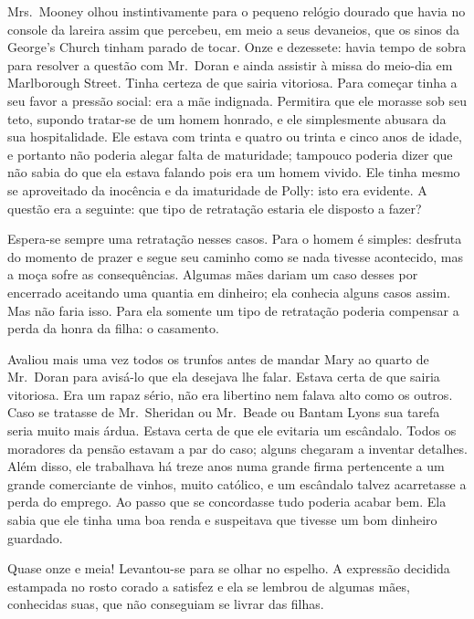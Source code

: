 Mrs.~Mooney olhou instintivamente para o pequeno relógio dourado que havia no
console da lareira assim que percebeu, em meio a seus devaneios, que os sinos
da George’s Church tinham parado de tocar.  Onze e dezessete: havia tempo de
sobra para resolver a questão com Mr.~Doran e ainda assistir à missa do
meio-dia em Marlborough Street.  Tinha certeza de que sairia vitoriosa.  Para
começar tinha a seu favor a pressão social: era a mãe indignada.  Permitira que
ele morasse sob seu teto, supondo tratar-se de um homem honrado, e ele
simplesmente abusara da sua hospitalidade.  Ele estava com trinta e quatro ou
trinta e cinco anos de idade, e portanto não poderia alegar falta de
maturidade; tampouco poderia dizer que não sabia do que ela estava falando pois
era um homem vivido.  Ele tinha mesmo se aproveitado da inocência e da
imaturidade de Polly: isto era evidente.  A questão era a seguinte: que tipo de
retratação estaria ele disposto a fazer?

Espera-se sempre uma retratação nesses casos.  Para o homem é simples: desfruta
do momento de prazer e segue seu caminho como se nada tivesse acontecido, mas a
moça sofre as consequências.  Algumas mães dariam um caso desses por encerrado
aceitando uma quantia em dinheiro; ela conhecia alguns casos assim.  Mas não
faria isso.  Para ela somente um tipo de retratação poderia compensar a perda
da honra da filha: o casamento.

Avaliou mais uma vez todos os trunfos antes de mandar Mary ao quarto de Mr.~Doran 
para avisá-lo que ela desejava lhe falar.  Estava certa de que sairia
vitoriosa.  Era um rapaz sério, não era libertino nem falava alto como os
outros.  Caso se tratasse de Mr.~Sheridan ou Mr.~Beade ou Bantam Lyons sua
tarefa seria muito mais árdua.  Estava certa de que ele evitaria um escândalo.
Todos os moradores da pensão estavam a par do caso; alguns chegaram a inventar
detalhes.  Além disso, ele trabalhava há treze anos numa grande firma
pertencente a um grande comerciante de vinhos, muito católico, e um escândalo
talvez acarretasse a perda do emprego.  Ao passo que se concordasse tudo
poderia acabar bem.  Ela sabia que ele tinha uma boa renda e suspeitava que
tivesse um bom dinheiro guardado.

Quase onze e meia!  Levantou-se para se olhar no espelho.  A expressão decidida
estampada no rosto corado a satisfez e ela se lembrou de algumas mães,
conhecidas suas, que não conseguiam se livrar das filhas.

